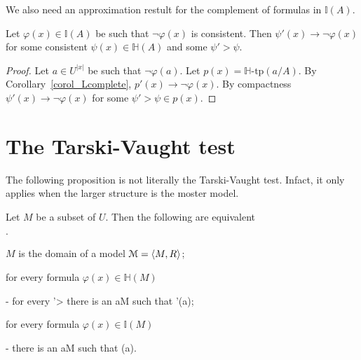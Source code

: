 \documentclass[11pt,oneside]{amsart}
\newcommand{\mylabel}[1]{{#1}\hfill}
\renewenvironment{itemize}
  {\begin{list}{$\cdot$}{%
  \setlength{\parskip}{0mm}
  \setlength{\topsep}{.2\baselineskip}
  \setlength{\rightmargin}{0mm}
  \setlength{\listparindent}{0mm}
  \setlength{\itemindent}{0mm}
  \setlength{\labelwidth}{3ex}
  \setlength{\itemsep}{.2\baselineskip}
  \setlength{\parsep}{.2\baselineskip}
  \setlength{\partopsep}{0mm}
  \setlength{\labelsep}{1ex}
  \setlength{\leftmargin}{\labelwidth+\labelsep}
  \let\makelabel\mylabel}}{%
\end{list}}
\begin{document}
We also need an approximation restult for the complement of formulas in $\mathds{I}(A)$.

\begin{proposition}\label{prop_LHapprox2}
  Let $\varphi(x)\in\mathds{I}(A)$ be such that $\neg\varphi(x)$ is consistent.
  Then  $\psi'(x)\rightarrow\neg\varphi(x)$ for some consistent $\psi(x)\in\mathds{H}(A)$ and some $\psi'>\psi$.
\end{proposition}



\begin{proof}
  Let $a\in U^{|x|}$ be such that $\neg\varphi(a)$.
  Let $p(x)=\mathds{H}\mbox{-tp}(a/A)$.
  By Corollary~\ref{corol_Lcomplete}, $p'(x)\rightarrow\neg\varphi(x)$. 
  By compactness  $\psi'(x)\rightarrow\neg\varphi(x)$ for some $\psi'>\psi\in p(x)$. 
\end{proof}


\section{The Tarski-Vaught test}

The following proposition is not literally the Tarski-Vaught test.
Infact, it only applies when the larger structure is the moster model.

\begin{proposition}
  Let $M$ be a subset of $U$.
  Then the following are equivalent
  \begin{itemize}
    \item[1.] $M$ is the domain of a model ${\EuScript M}=\langle M,R\rangle$;
    \item[2.] for every formula $\varphi(x)\in\mathds{H}(M)$
    
    \noindent\kern-\leftmargin
    {\textrm{ for every }\varphi'>\varphi\textrm{ there is an }a\in M\textrm{ such that }\varphi'(a);}
    \item[3.] for every formula $\varphi(x)\in\mathds{I}(M)$
    
    \noindent\kern-\leftmargin
    {\textrm{ there is an }a\in M\textrm{ such that }\neg\varphi(a).}
    
  \end{itemize}
\end{proposition}
\end{document}

